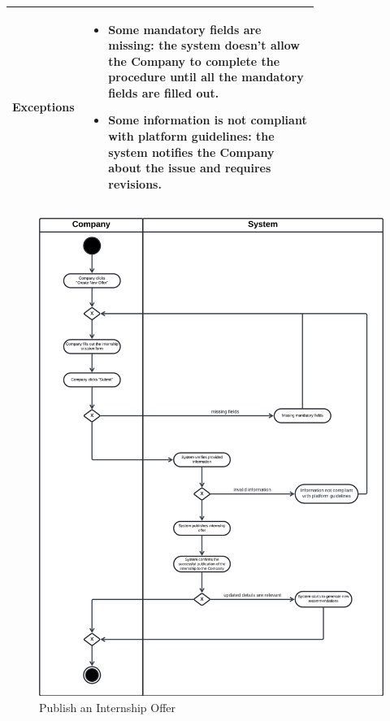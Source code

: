 \begin{center}
\begin{longtable}{|l|p{0.75\linewidth}|}
        \hline
        \textbf{Exceptions}       & \begin{itemize}
            \item Some mandatory fields are missing: the system doesn’t allow the Company to complete the procedure until all the mandatory fields are filled out.
            \item Some information is not compliant with platform guidelines: the system notifies the Company about the issue and requires revisions.
        \end{itemize} \\
        \hline
    \end{longtable}
\end{center}

\begin{figure}[H]
    \begin{center}
         \includegraphics[width=1\linewidth]{LaTeXCode/images/activity diagram/UC6.png}
         \caption{Publish an Internship Offer}
         \label{fig:publish_offer_ad}
     \end{center}
\end{figure}


